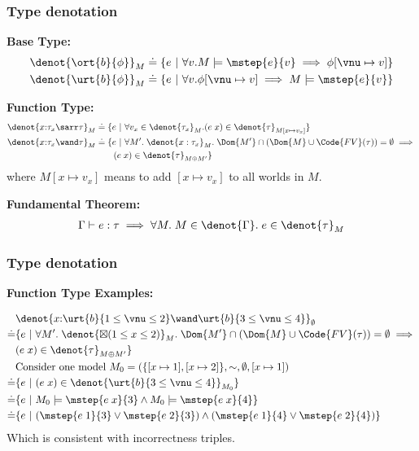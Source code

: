 \begin{frame}[fragile]
    \frametitle{Type denotation}

\textbf{Base Type:}
\begin{align*}
    \denot{\ort{b}{\phi}}_M &\doteq \{ e ~|~ \forall v. M \models \mstep{e}{v} \implies \phi[\vnu \mapsto v] \} \\
    \denot{\urt{b}{\phi}}_M &\doteq \{ e ~|~ \forall v. \phi[\vnu \mapsto v] \implies M \models \mstep{e}{v} \}
\end{align*}

\textbf{Function Type:}
\begin{align*}
    \denot{x{:}\tau_x \sarr \tau}_M &\doteq \{ e ~|~ \forall v_x \in \denot{\tau_x}_M. (e\;x) \in \denot{\tau}_{M[x\mapsto v_x]} \} \\
    \denot{x{:}\tau_x \wand \tau}_M &\doteq \{ e ~|~ \forall M'.\; \denot{x : \tau_x}_M.\; \Dom{M'} \cap (\Dom{M} \cup \Code{FV}(\tau)) = \emptyset \implies 
    \\&\qquad (e\;x) \in \denot{\tau}_{M \oplus M'} \}
\end{align*}
where $M[x\mapsto v_x]$ means to add $[x\mapsto v_x]$ to all worlds in $M$.

\vspace{0.5cm}
\textbf{Fundamental Theorem:}
\begin{align*}
    \Gamma \vdash e : \tau \implies \forall M.\; M \in \denot{\Gamma}.\; e \in \denot{\tau}_M
\end{align*}

\end{frame}

\begin{frame}[fragile]
    \frametitle{Type denotation}

\textbf{Function Type Examples:}

\begin{align*}
    &\denot{x{:}\urt{b}{1 \leq \vnu \leq 2} \wand \urt{b}{3 \leq \vnu \leq 4}}_{\emptyset} 
    \\\doteq &\{ e ~|~ \forall M'.\; \denot{\boxtimes (1 \leq x \leq 2)}_M.\; \Dom{M'} \cap (\Dom{M} \cup \Code{FV}(\tau)) = \emptyset \implies 
    \\& (e\;x) \in \denot{\tau}_{M \oplus M'} \}
    \\&\text{Consider one model}~ M_0 = (\{[x\mapsto 1], [x\mapsto 2]\}, \sim, \emptyset, [x\mapsto 1])
    \\\doteq &\{ e ~|~ (e\;x) \in \denot{\urt{b}{3 \leq \vnu \leq 4}}_{M_0} \}
    \\ \doteq &\{ e ~|~ M_0 \models \mstep{e\;x}{3} \land M_0 \models \mstep{e\;x}{4} \}
    \\ \doteq &\{ e ~|~ (\mstep{e\;1}{3} \lor \mstep{e\;2}{3}) \land (\mstep{e\;1}{4} \lor \mstep{e\;2}{4}) \}
\end{align*}
Which is consistent with incorrectness triples.

\end{frame}